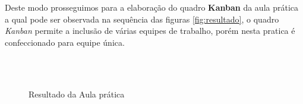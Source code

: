 \par Deste modo prosseguimos para a elaboração do quadro \textbf{Kanban} da aula prática a qual pode ser observada na sequência das figuras \ref{fig:resultado}, o quadro \textit{Kanban} permite a inclusão de várias equipes de trabalho, porém nesta pratica é confeccionado para equipe única.

\begin{figure}[H] %
  \center
  \caption{Resultado da Aula prática}
  \\
  \\

\end{figure}
